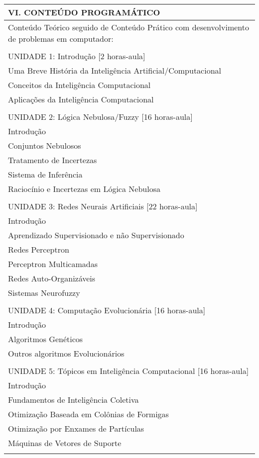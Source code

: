 \documentclass[12pt]{article}
\begin{document}
\begin{longtable}{|L{1.025\textwidth}|} \hline
%
{\bf VI. CONTEÚDO PROGRAMÁTICO } \\ \hline

Conteúdo Teórico seguido de Conteúdo Prático com desenvolvimento de problemas em computador: \\
\\
UNIDADE 1: Introdução [2 horas-aula]\\
Uma Breve História da Inteligência Artificial/Computacional\\
Conceitos da Inteligência Computacional\\
Aplicações da Inteligência Computacional\\
\\
UNIDADE 2: Lógica Nebulosa/Fuzzy [16 horas-aula]\\
Introdução\\
Conjuntos Nebulosos\\
Tratamento de Incertezas\\
Sistema de Inferência\\
Raciocínio e Incertezas em Lógica Nebulosa\\
\\
UNIDADE 3: Redes Neurais Artificiais [22 horas-aula]\\
Introdução\\
Aprendizado Supervisionado e não Supervisionado\\
Redes Perceptron\\
Perceptron Multicamadas\\
Redes Auto-Organizáveis\\
Sistemas Neurofuzzy\\
\\
UNIDADE 4: Computação Evolucionária [16 horas-aula]\\
Introdução\\
Algoritmos Genéticos\\
Outros algoritmos Evolucionários\\
\\
UNIDADE 5: Tópicos em Inteligência Computacional [16 horas-aula]\\
Introdução\\
Fundamentos de Inteligência Coletiva\\
Otimização Baseada em Colônias de Formigas\\
Otimização por Enxames de Partículas\\
Máquinas de Vetores de Suporte\\

\\ \hline
\end{longtable} 
\end{document}
